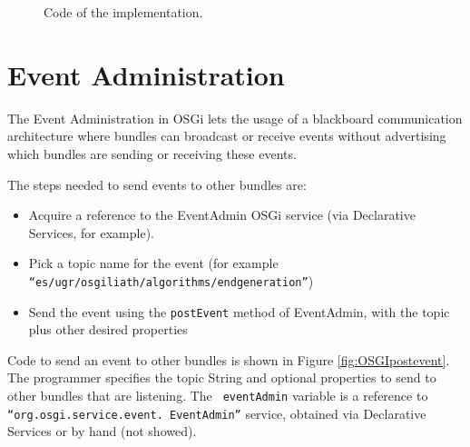\begin{figure}
\usebox{\mintedboxOSGIspecific}
\caption{Code of the implementation.}
\label{fig:OSGIspecific} 
\end{figure}


\section{Event Administration}
The Event Administration in OSGi lets the usage of a blackboard communication architecture where bundles can broadcast or receive events without advertising which bundles are sending or receiving these events.


The steps needed to send events to other bundles are:
\begin{itemize}
\item Acquire a reference to the EventAdmin OSGi service (via Declarative Services, for example).
\item Pick a topic name for the event (for example \texttt{``es\-/ugr\-/os\-gi\-liath\-/al\-go\-rithms\-/end\-ge\-ne\-ra\-tion''})
\item Send the event using the \texttt{postEvent} method of EventAdmin, with the topic plus other desired properties %
\end{itemize}

Code to send an event to other bundles is shown in Figure \ref{fig:OSGIpostevent}. The programmer specifies the topic String and optional properties to send to other bundles that are listening. The \texttt{ eventAdmin} variable is a reference to \texttt{``org.osgi.service.event. EventAdmin''} service, obtained via Declarative Services or by hand (not showed).


